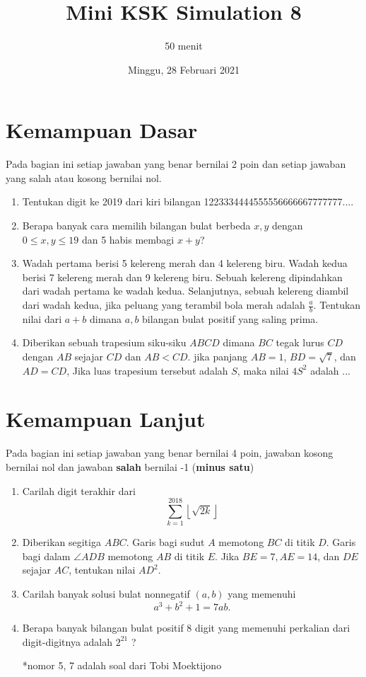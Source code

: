 \documentclass{article}
\title{Mini KSK Simulation 8 }
\author{50 menit}
\date{Minggu, 28 Februari 2021}
\begin{document}
	\maketitle
	
	\section{Kemampuan Dasar}
	Pada bagian ini setiap jawaban yang benar bernilai 2 poin dan setiap jawaban yang salah
	atau kosong bernilai nol.
	\begin{enumerate}
		\item
		Tentukan digit ke 2019 dari kiri bilangan 1223334444555556666667777777....
		
		\item
		Berapa banyak cara memilih bilangan bulat berbeda $x, y$ dengan $0 \le x, y \le 19$ dan 5 habis membagi $x + y$?
		
		\item
		Wadah pertama berisi 5 kelereng merah dan 4 kelereng biru. Wadah kedua berisi 7 kelereng merah dan
		9 kelereng biru. Sebuah kelereng dipindahkan dari wadah pertama ke wadah kedua. Selanjutnya, sebuah
		kelereng diambil dari wadah kedua, jika peluang yang terambil bola merah adalah
		$\frac{a}{b}$. Tentukan nilai dari $a+b$ dimana $a, b$ bilangan bulat positif yang saling prima.
		
		\item
		Diberikan sebuah trapesium siku-siku $ABCD$ dimana $BC$ tegak lurus $CD$ dengan $AB$ sejajar $CD$ dan $AB < CD$. jika panjang $AB = 1$, $BD = \sqrt{7}$, dan $AD = CD$, Jika luas trapesium tersebut adalah $S$, maka nilai $4S^2$ adalah ...
		
	\end{enumerate}
\section{Kemampuan Lanjut}
Pada bagian ini setiap jawaban yang benar bernilai 4 poin, jawaban kosong bernilai nol
dan jawaban \textbf{salah} bernilai -1 (\textbf{minus satu})

\begin{enumerate}[resume]
	\item
	Carilah digit terakhir dari $$\sum_{k=1}^{2018} \left \lfloor \sqrt{2k} \right \rfloor $$
	\item Diberikan segitiga $ABC$. Garis bagi sudut $A$ memotong $BC$ di titik $D$. Garis bagi
	dalam $\angle ADB$ memotong $AB$ di titik $E$. Jika $BE = 7, AE = 14$, dan $DE$ sejajar $AC$,
	tentukan nilai $AD^2$.
	\item
	Carilah banyak solusi bulat nonnegatif $(a,b)$ yang memenuhi $$a^3+b^2+1=7ab.$$
	
	\item
	Berapa banyak bilangan bulat positif 8 digit yang memenuhi perkalian dari digit-digitnya adalah $2^{21}$
	?
	
	*nomor 5, 7 adalah soal dari Tobi Moektijono
	
	
	
	
	
\end{enumerate}
\end{document}
